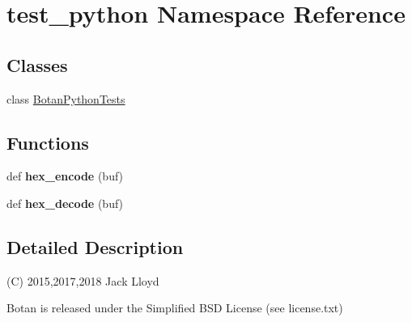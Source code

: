 \hypertarget{namespacetest__python}{}\section{test\+\_\+python Namespace Reference}
\label{namespacetest__python}
\subsection*{Classes}
\begin{DoxyCompactItemize}
\item 
class \mbox{\hyperlink{classtest__python_1_1_botan_python_tests}{Botan\+Python\+Tests}}
\end{DoxyCompactItemize}
\subsection*{Functions}
\begin{DoxyCompactItemize}
\item 
\mbox{\label{namespacetest__python_aa5321edcfee16a47766aea27b63ffc10}} 
def {\bfseries hex\+\_\+encode} (buf)
\item 
\mbox{\label{namespacetest__python_ad521b3dd56839730d486078c75db35fd}} 
def {\bfseries hex\+\_\+decode} (buf)
\end{DoxyCompactItemize}


\subsection{Detailed Description}
\begin{DoxyVerb}(C) 2015,2017,2018 Jack Lloyd

Botan is released under the Simplified BSD License (see license.txt)
\end{DoxyVerb}
 